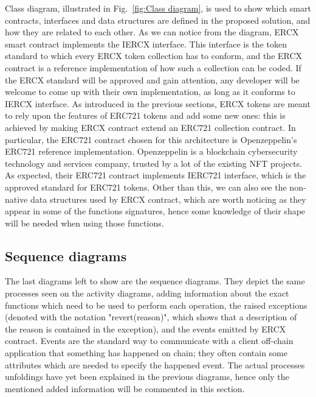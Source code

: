 \documentclass[english, LaM, oneside]{sapthesis}%
\begin{document}
Class diagram, illustrated in Fig.~\ref{fig:Class diagram}, is used to show which smart contracts, interfaces and data structures are defined in the proposed solution, and how they are related to each other. As we can notice from the diagram, ERCX smart contract implements the IERCX interface. This interface is the token standard to which every ERCX token collection has to conform, and the ERCX contract is a reference implementation of how such a collection can be coded. If the ERCX standard will be approved and gain attention, any developer will be welcome to come up with their own implementation, as long as it conforms to IERCX interface.\newline
As introduced in the previous sections, ERCX tokens are meant to rely upon the features of ERC721 tokens and add some new ones: this is achieved by making ERCX contract extend an ERC721 collection contract. In particular, the ERC721 contract chosen for this architecture is Openzeppelin's\cite{ref:openzeppelin} ERC721 reference implementation. Openzeppelin is a blockchain cybersecurity technology and services company, trusted by a lot of the existing  NFT projects. As expected, their ERC721 contract implements IERC721 interface, which is the approved standard for ERC721 tokens.\newline
Other than this, we can also see the non-native data structures used by ERCX contract, which are worth noticing as they appear in some of the functions signatures, hence some knowledge of their shape will be needed when using those functions.


\subsection{Sequence diagrams}
The last diagrams left to show are the sequence diagrams. They depict the same processes seen on the activity diagrams, adding information about the exact functions which need to be used to perform each operation, the raised exceptions (denoted with the notation "revert(reason)", which shows that a description of the reason is contained in the exception), and the events emitted by ERCX contract. Events are the standard way to communicate with a client off-chain application that something has happened on chain; they often contain some attributes which are needed to specify the happened event. \newline
The actual processes unfoldings have yet been explained in the previous diagrams, hence only the mentioned added information will be commented in this section.
\end{document}
